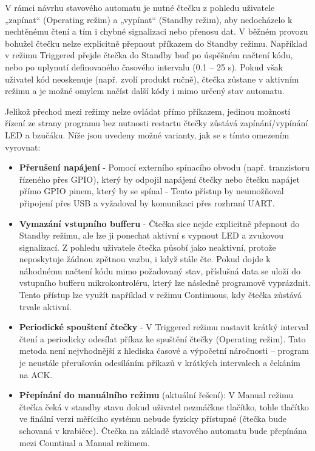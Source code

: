 V rámci návrhu stavového automatu je nutné čtečku z pohledu uživatele „zapínat“ (Operating režim) a „vypínat“ (Standby režim), aby nedocházelo k nechtěnému čtení a tím i chybné signalizaci nebo přenosu dat. V běžném provozu bohužel čtečku nelze explicitně přepnout příkazem do Standby režimu. Například v režimu Triggered přejde čtečka do Standby buď po úspěšném načtení kódu, nebo po uplynutí definovaného časového intervalu (0.1 – 25 s). Pokud však uživatel kód neoskenuje (např. zvolí produkt ručně), čtečka zůstane v aktivním režimu a je možné omylem načíst další kódy i mimo určený stav automatu.

Jelikož přechod mezi režimy nelze ovládat přímo příkazem, jedinou možností řízení ze strany programu bez nutnosti restartu čtečky zůstává zapínání/vypínání LED a bzučáku. Níže jsou uvedeny možné varianty, jak se s tímto omezením vyrovnat:

\begin{itemize}
    \item \textbf{Přerušení napájení} - Pomocí externího spínacího obvodu (např. tranzistoru řízeného přes GPIO), který by odpojil napájení čtečky nebo čtečku napájet přímo GPIO pinem, který by se spínal - Tento přístup by neumožňoval připojení přes USB a vyžadoval by komunikaci přes rozhraní UART.
    \item \textbf{Vymazání vstupního bufferu} - Čtečka sice nejde explicitně přepnout do Standby režimu, ale lze ji ponechat aktivní s vypnout LED a zvukovou signalizací. Z pohledu uživatele čtečka působí jako neaktivní, protože neposkytuje žádnou zpětnou vazbu, i když stále čte. Pokud dojde k náhodnému načtení kódu mimo požadovaný stav, příslušná data se uloží do vstupního bufferu mikrokontroléru, který lze následně programově vyprázdnit. Tento přístup lze využít například v režimu Continuous, kdy čtečka zůstává trvale aktivní.
    \item \textbf{Periodické spouštení čtečky} - V Triggered režimu nastavit krátký interval čtení a periodicky odesílat příkaz ke spuštění čtečky (Operating režim). Tato metoda není nejvhodnější z hlediska časové a výpočetní náročnosti – program je neustále přerušován odesíláním příkazů v krátkých intervalech a čekáním na ACK.
    \item \textbf{Přepínání do manuálního režimu} (aktuální řešení): V Manual režimu čtečka čeká v standby stavu dokud uživatel nezmáčkne tlačítko, tohle tlačítko ve finální verzi měříciho systému nebude fyzicky přístupné (čtečka bude schovaná v krabičce). Čtečka na základě stavového automatu bude přepínána mezi Countiual a Manual režimem.
\end{itemize}




